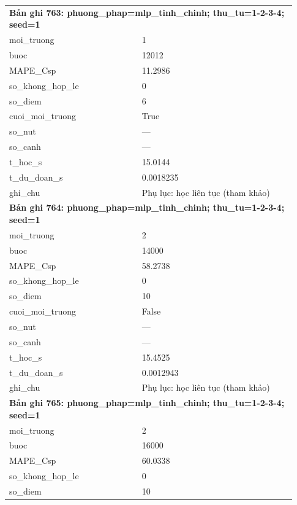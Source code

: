 \begin{longtable}{p{0.43\linewidth}p{0.50\linewidth}}
\midrule
\multicolumn{2}{p{0.95\linewidth}}{\textbf{Bản ghi 763: phuong\_phap=mlp\_tinh\_chinh; thu\_tu=1-2-3-4; seed=1}} \\
moi\_\allowbreak truong & 1 \\
buoc & 12012 \\
MAPE\_\allowbreak Csp & 11.2986 \\
so\_\allowbreak khong\_\allowbreak hop\_\allowbreak le & 0 \\
so\_\allowbreak diem & 6 \\
cuoi\_\allowbreak moi\_\allowbreak truong & True \\
so\_\allowbreak nut & — \\
so\_\allowbreak canh & — \\
t\_\allowbreak hoc\_\allowbreak s & 15.0144 \\
t\_\allowbreak du\_\allowbreak doan\_\allowbreak s & 0.0018235 \\
ghi\_\allowbreak chu & Phụ lục: học liên tục (tham khảo) \\
\midrule
\multicolumn{2}{p{0.95\linewidth}}{\textbf{Bản ghi 764: phuong\_phap=mlp\_tinh\_chinh; thu\_tu=1-2-3-4; seed=1}} \\
moi\_\allowbreak truong & 2 \\
buoc & 14000 \\
MAPE\_\allowbreak Csp & 58.2738 \\
so\_\allowbreak khong\_\allowbreak hop\_\allowbreak le & 0 \\
so\_\allowbreak diem & 10 \\
cuoi\_\allowbreak moi\_\allowbreak truong & False \\
so\_\allowbreak nut & — \\
so\_\allowbreak canh & — \\
t\_\allowbreak hoc\_\allowbreak s & 15.4525 \\
t\_\allowbreak du\_\allowbreak doan\_\allowbreak s & 0.0012943 \\
ghi\_\allowbreak chu & Phụ lục: học liên tục (tham khảo) \\
\midrule
\multicolumn{2}{p{0.95\linewidth}}{\textbf{Bản ghi 765: phuong\_phap=mlp\_tinh\_chinh; thu\_tu=1-2-3-4; seed=1}} \\
moi\_\allowbreak truong & 2 \\
buoc & 16000 \\
MAPE\_\allowbreak Csp & 60.0338 \\
so\_\allowbreak khong\_\allowbreak hop\_\allowbreak le & 0 \\
so\_\allowbreak diem & 10 \\

\end{longtable}
